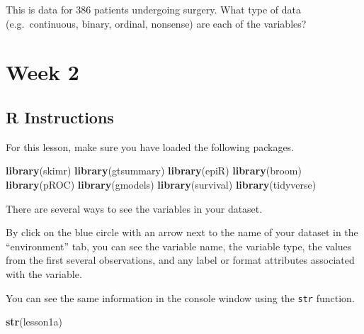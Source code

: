 \documentclass[]{book}
\newenvironment{Shaded}{\begin{snugshade}}{\end{snugshade}}
\newcommand{\KeywordTok}[1]{\textcolor[rgb]{0.13,0.29,0.53}{\textbf{#1}}}
\newcommand{\NormalTok}[1]{#1}
\begin{document}
This is data for 386 patients undergoing surgery. What type of data
(e.g.~continuous, binary, ordinal, nonsense) are each of the variables?

\hypertarget{week-2}{%
\chapter{Week 2}\label{week-2}}

\hypertarget{r-instructions-1}{%
\section{R Instructions}\label{r-instructions-1}}

For this lesson, make sure you have loaded the following packages.

\begin{Shaded}
\begin{Highlighting}[]
\KeywordTok{library}\NormalTok{(skimr)}
\KeywordTok{library}\NormalTok{(gtsummary)}
\KeywordTok{library}\NormalTok{(epiR)}
\KeywordTok{library}\NormalTok{(broom)}
\KeywordTok{library}\NormalTok{(pROC)}
\KeywordTok{library}\NormalTok{(gmodels)}
\KeywordTok{library}\NormalTok{(survival)}
\KeywordTok{library}\NormalTok{(tidyverse)}
\end{Highlighting}
\end{Shaded}

There are several ways to see the variables in your dataset.

By click on the blue circle with an arrow next to the name of your
dataset in the ``environment'' tab, you can see the variable name, the
variable type, the values from the first several observations, and any
label or format attributes associated with the variable.

You can see the same information in the console window using the
\texttt{str} function.

\begin{Shaded}
\begin{Highlighting}[]
\KeywordTok{str}\NormalTok{(lesson1a)}
\end{Highlighting}
\end{Shaded}
\end{document}
